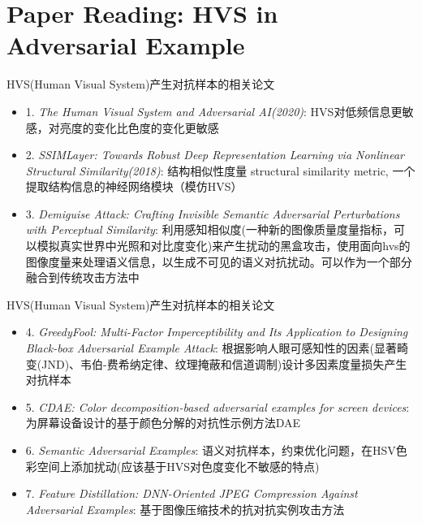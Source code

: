 \section{Paper Reading: HVS in Adversarial Example}

\begin{frame}{HVS(Human Visual System)产生对抗样本的相关论文}
    \begin{itemize}
        \item 1. \emph{The Human Visual System and Adversarial AI(2020)}: HVS对低频信息更敏感，对亮度的变化比色度的变化更敏感
        \item 2. \emph{SSIMLayer: Towards Robust Deep Representation Learning via Nonlinear Structural Similarity(2018)}: 结构相似性度量 structural similarity metric, 一个提取结构信息的神经网络模块（模仿HVS）
        \item 3. \emph{Demiguise Attack: Crafting Invisible Semantic Adversarial Perturbations with Perceptual Similarity}: 利用感知相似度(一种新的图像质量度量指标，可以模拟真实世界中光照和对比度变化)来产生扰动的黑盒攻击，使用面向hvs的图像度量来处理语义信息，以生成不可见的语义对抗扰动。可以作为一个部分融合到传统攻击方法中
    \end{itemize}
\end{frame}

\begin{frame}{HVS(Human Visual System)产生对抗样本的相关论文}
    \begin{itemize}
        \item 4. \emph{GreedyFool: Multi-Factor Imperceptibility and Its Application to Designing Black-box Adversarial Example Attack}: 根据影响人眼可感知性的因素(显著畸变(JND)、韦伯-费希纳定律、纹理掩蔽和信道调制)设计多因素度量损失产生对抗样本
        \item 5. \emph{CDAE: Color decomposition-based adversarial examples for screen devices}: 为屏幕设备设计的基于颜色分解的对抗性示例方法DAE
        \item 6. \emph{Semantic Adversarial Examples}: 语义对抗样本，约束优化问题，在HSV色彩空间上添加扰动(应该基于HVS对色度变化不敏感的特点)
        \item 7. \emph{Feature Distillation: DNN-Oriented JPEG Compression Against Adversarial Examples}: 基于图像压缩技术的抗对抗实例攻击方法
    \end{itemize}
\end{frame}

